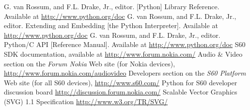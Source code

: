 %
%
%
 
\begin{thebibliography}{99}
 G. van Rossum, and F.L. Drake, Jr., editor. [Python] Library Reference. Available at \url{http://www.python.org/doc}
 G. van Rossum, and F.L. Drake, Jr., editor. Extending and Embedding [the Python Interpreter]. Available at \url{http://www.python.org/doc}
 G. van Rossum, and F.L. Drake, Jr., editor. Python/C API [Reference Manual]. Available at \url{http://www.python.org/doc}
 S60 SDK documentation, available at \url{http://www.forum.nokia.com/}
 Audio {\&} Video section on the \textit{Forum Nokia} Web site (for Nokia devices), \url{http://www.forum.nokia.com/audiovideo}
 Developers section on the \textit{S60 Platform} Web site (for all S60 devices), \url{http://www.s60.com/}
 Python for S60 developer discussion board \url{http://discussion.forum.nokia.com/}
 Scalable Vector Graphics (SVG) 1.1 Specification \url{http://www.w3.org/TR/SVG/}
\end{thebibliography}
